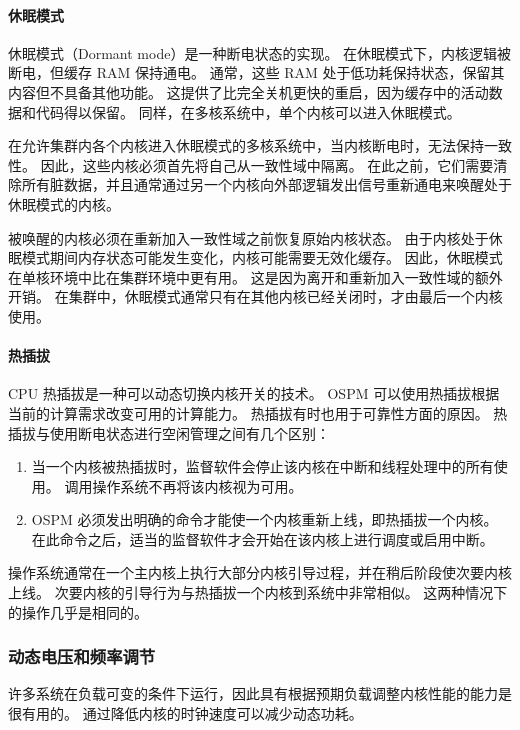 \paragraph*{休眠模式}

休眠模式（Dormant mode）是一种断电状态的实现。
在休眠模式下，内核逻辑被断电，但缓存 RAM 保持通电。
通常，这些 RAM 处于低功耗保持状态，保留其内容但不具备其他功能。
这提供了比完全关机更快的重启，因为缓存中的活动数据和代码得以保留。
同样，在多核系统中，单个内核可以进入休眠模式。

在允许集群内各个内核进入休眠模式的多核系统中，当内核断电时，无法保持一致性。
因此，这些内核必须首先将自己从一致性域中隔离。
在此之前，它们需要清除所有脏数据，并且通常通过另一个内核向外部逻辑发出信号重新通电来唤醒处于休眠模式的内核。

被唤醒的内核必须在重新加入一致性域之前恢复原始内核状态。
由于内核处于休眠模式期间内存状态可能发生变化，内核可能需要无效化缓存。
因此，休眠模式在单核环境中比在集群环境中更有用。
这是因为离开和重新加入一致性域的额外开销。
在集群中，休眠模式通常只有在其他内核已经关闭时，才由最后一个内核使用。

\paragraph*{热插拔}

CPU 热插拔是一种可以动态切换内核开关的技术。
OSPM 可以使用热插拔根据当前的计算需求改变可用的计算能力。
热插拔有时也用于可靠性方面的原因。
热插拔与使用断电状态进行空闲管理之间有几个区别：

\begin{enumerate}
\item
  当一个内核被热插拔时，监督软件会停止该内核在中断和线程处理中的所有使用。
  调用操作系统不再将该内核视为可用。
\item
  OSPM 必须发出明确的命令才能使一个内核重新上线，即热插拔一个内核。
  在此命令之后，适当的监督软件才会开始在该内核上进行调度或启用中断。
\end{enumerate}

操作系统通常在一个主内核上执行大部分内核引导过程，并在稍后阶段使次要内核上线。
次要内核的引导行为与热插拔一个内核到系统中非常相似。
这两种情况下的操作几乎是相同的。

\subsubsection{动态电压和频率调节}\label{sec:pm-dyn-vol-freq-scale}

许多系统在负载可变的条件下运行，因此具有根据预期负载调整内核性能的能力是很有用的。
通过降低内核的时钟速度可以减少动态功耗。

